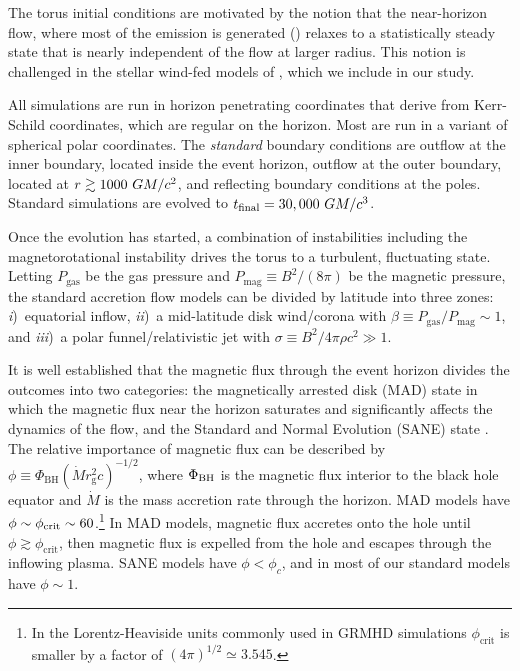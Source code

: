 The torus initial conditions are motivated by the notion that the near-horizon flow, where most of the emission is generated () relaxes to a statistically steady state that is nearly independent of the flow at larger radius.  This notion is challenged in the stellar wind-fed models of \cite{2020ApJ...896L...6R}, which we include in our study.

All simulations are run in horizon penetrating coordinates that derive from Kerr-Schild coordinates, which are regular on the horizon.
Most are run in a variant of spherical polar coordinates.
The \emph{standard} boundary conditions are outflow at the inner boundary, located inside the event horizon, outflow at the outer boundary, located at $r \gtrsim 1000~GM/c^2$, and reflecting boundary conditions at the poles.
Standard simulations are evolved to $t_\mathrm{final} = 30,000~GM/c^3$.

Once the evolution has started, a combination of instabilities including the magnetorotational instability \citep[MRI][]{1992ApJ...400..610B} drives the torus to a turbulent, fluctuating state.
Letting $P_\mathrm{gas}$ be the gas pressure and $P_\mathrm{mag} \equiv B^2 / (8\pi)$ be the magnetic pressure, the standard accretion flow models can be divided by latitude into three zones:
\emph{i})~equatorial inflow,
\emph{ii})~a mid-latitude disk wind/corona with  $\beta  \equiv P_\mathrm{gas} / P_\mathrm{mag} \sim 1$, and
\emph{iii})~a polar funnel/relativistic jet with $\sigma \equiv B^2/4\pi \rho c^2 \gg 1$.

It is well established  that the magnetic flux through the event horizon divides the outcomes into two categories: the magnetically arrested disk (MAD) state \citep[e.g.,][]{1974Ap&SS..28...45B, 2003ApJ...592.1042I, 2003PASJ...55L..69N} in which the magnetic flux near the horizon saturates and significantly affects the dynamics of the flow, and the Standard and Normal Evolution (SANE) state \citep[e.g.,][]{2003ApJ...589..444G, 2003ApJ...599.1238D, 2012MNRAS.426.3241N}.
The relative importance of magnetic flux can be described by $\phi \equiv \Phi_{\mathrm{BH}} (\dot{M} r_\mathrm{g}^2 c)^{-1/2}$, where $\Phi_{\rm BH}$ is the magnetic flux interior to the black hole equator and $\dot{M}$ is the mass accretion rate through the horizon.
MAD models have $\phi \sim \phi_{\rm crit} \sim 60$.\footnote{In the Lorentz-Heaviside units commonly used in GRMHD simulations $\phi_\mathrm{crit}$ is smaller by a factor of $(4\pi)^{1/2} \simeq 3.545$.}
In MAD models, magnetic flux accretes onto the hole until $\phi \gtrsim \phi_\mathrm{crit}$, then magnetic flux is expelled from the hole and escapes through the inflowing plasma.
SANE models have $\phi < \phi_c$, and in most of our standard models have $\phi \sim 1$.

